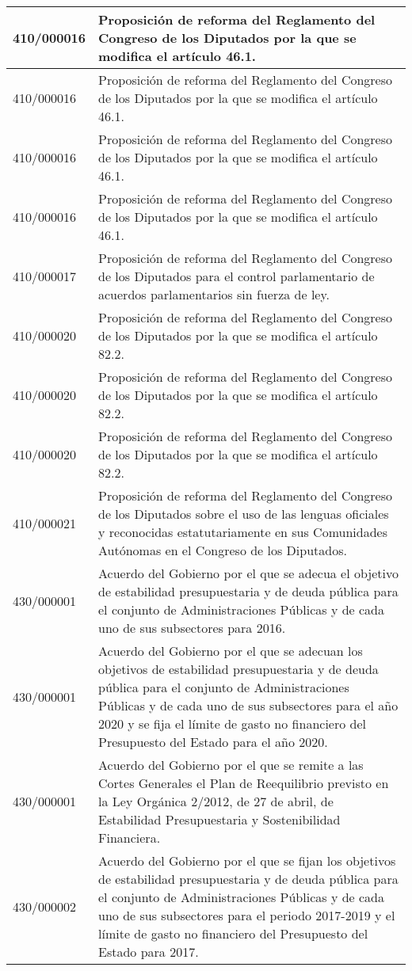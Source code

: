 {\begin{table}[H]
\begin{center}
\begin{tabularx}{\linewidth}{| l | X |}
\hline
410/000016 & Proposición de reforma del Reglamento del Congreso de los Diputados por la que se modifica el artículo 46.1. \\
\hline
410/000016 & Proposición de reforma del Reglamento del Congreso de los Diputados por la que se modifica el artículo 46.1. \\
\hline
410/000016 & Proposición de reforma del Reglamento del Congreso de los Diputados por la que se modifica el artículo 46.1. \\
\hline
410/000016 & Proposición de reforma del Reglamento del Congreso de los Diputados por la que se modifica el artículo 46.1. \\
\hline
410/000017 & Proposición de reforma del Reglamento del Congreso de los Diputados para el control parlamentario de acuerdos parlamentarios sin fuerza de ley. \\
\hline
410/000020 & Proposición de reforma del Reglamento del Congreso de los Diputados por la que se modifica el artículo 82.2. \\
\hline
410/000020 & Proposición de reforma del Reglamento del Congreso de los Diputados por la que se modifica el artículo 82.2. \\
\hline
410/000020 & Proposición de reforma del Reglamento del Congreso de los Diputados por la que se modifica el artículo 82.2. \\
\hline
410/000021 & Proposición de reforma del Reglamento del Congreso de los Diputados sobre el uso de las lenguas oficiales y reconocidas estatutariamente en sus Comunidades Autónomas en el Congreso de los Diputados. \\
\hline
430/000001 & Acuerdo del Gobierno por el que se adecua el objetivo de estabilidad presupuestaria y de deuda pública para el conjunto de Administraciones Públicas y de cada uno de sus subsectores para 2016. \\
\hline
430/000001 & Acuerdo del Gobierno por el que se adecuan los objetivos de estabilidad presupuestaria y de deuda pública para el conjunto de Administraciones Públicas y de cada uno de sus subsectores para el año 2020 y se fija el límite de gasto no financiero del Presupuesto del Estado para el año 2020. \\
\hline
430/000001 & Acuerdo del Gobierno por el que se remite a las Cortes Generales el Plan de Reequilibrio previsto en la Ley Orgánica 2/2012, de 27 de abril, de Estabilidad Presupuestaria y Sostenibilidad Financiera. \\
\hline
430/000002 & Acuerdo del Gobierno por el que se fijan los objetivos de estabilidad presupuestaria y de deuda pública para el conjunto de Administraciones Públicas y de cada uno de sus subsectores para el periodo 2017-2019 y el límite de gasto no financiero del Presupuesto del Estado para 2017. \\

\end{tabularx}
\end{center}
\end{table}}
